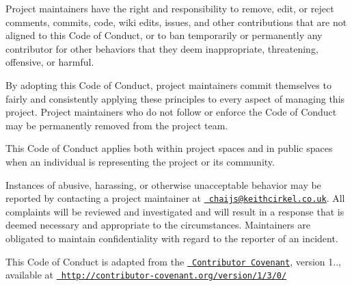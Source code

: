 Project maintainers have the right and responsibility to remove, edit, or reject comments, commits, code, wiki edits, issues, and other contributions that are not aligned to this Code of Conduct, or to ban temporarily or permanently any contributor for other behaviors that they deem inappropriate, threatening, offensive, or harmful.

By adopting this Code of Conduct, project maintainers commit themselves to fairly and consistently applying these principles to every aspect of managing this project. Project maintainers who do not follow or enforce the Code of Conduct may be permanently removed from the project team.

This Code of Conduct applies both within project spaces and in public spaces when an individual is representing the project or its community.

Instances of abusive, harassing, or otherwise unacceptable behavior may be reported by contacting a project maintainer at \href{mailto:chaijs@keithcirkel.co.uk}{\texttt{ chaijs@keithcirkel.\+co.\+uk}}. All complaints will be reviewed and investigated and will result in a response that is deemed necessary and appropriate to the circumstances. Maintainers are obligated to maintain confidentiality with regard to the reporter of an incident.

This Code of Conduct is adapted from the \href{http://contributor-covenant.org}{\texttt{ Contributor Covenant}}, version 1.., available at \href{http://contributor-covenant.org/version/1/3/0/}{\texttt{ http\+://contributor-\/covenant.\+org/version/1/3/0/}} 